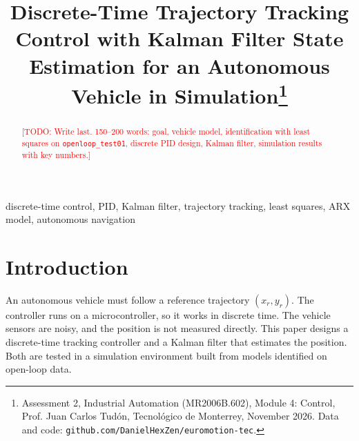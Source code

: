 \documentclass[conference]{IEEEtran}
\newcommand{\todo}[1]{\textcolor{red}{[TODO: #1]}}
\begin{document}
\title{Discrete-Time Trajectory Tracking Control with Kalman Filter State
Estimation for an Autonomous Vehicle in Simulation\thanks{Assessment 2,
Industrial Automation (MR2006B.602), Module 4: Control, Prof. Juan Carlos
Tud\'on, Tecnol\'ogico de Monterrey, November 2026. Data and code:
\texttt{github.com/DanielHexZen/euromotion-tec}.}}

\author{
\and
{}
\and
{}
\and
{}
}

\maketitle
\thispagestyle{plain}
\pagestyle{plain}

\begin{abstract}
\todo{Write last. 150--200 words: goal, vehicle model, identification
with least squares on \texttt{openloop\_test01}, discrete PID design,
Kalman filter, simulation results with key numbers.}
\end{abstract}

\begin{IEEEkeywords}
discrete-time control, PID, Kalman filter, trajectory tracking,
least squares, ARX model, autonomous navigation
\end{IEEEkeywords}

\section{Introduction}
An autonomous vehicle must follow a reference trajectory
$(x_r, y_r)$. The controller runs on a microcontroller, so it works in
discrete time. The vehicle sensors are noisy, and the position is not
measured directly. This paper designs a discrete-time tracking controller
and a Kalman filter that estimates the position. Both are tested in a
simulation environment built from models identified on open-loop data.
\end{document}
